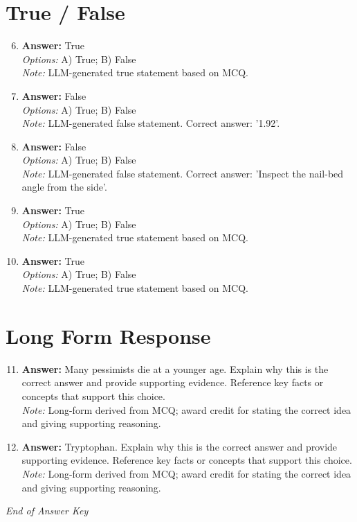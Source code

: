 \documentclass[12pt]{article}
\begin{document}
\section*{True / False}
\begin{enumerate}[label=\arabic*.]
\setcounter{enumi}{5}
\item \textbf{Answer:} True
\\ \textit{Options:} A) True; B) False
\\ \textit{Note:} LLM-generated true statement based on MCQ.
\item \textbf{Answer:} False
\\ \textit{Options:} A) True; B) False
\\ \textit{Note:} LLM-generated false statement. Correct answer: '1.92'.
\item \textbf{Answer:} False
\\ \textit{Options:} A) True; B) False
\\ \textit{Note:} LLM-generated false statement. Correct answer: 'Inspect the nail-bed angle from the side'.
\item \textbf{Answer:} True
\\ \textit{Options:} A) True; B) False
\\ \textit{Note:} LLM-generated true statement based on MCQ.
\item \textbf{Answer:} True
\\ \textit{Options:} A) True; B) False
\\ \textit{Note:} LLM-generated true statement based on MCQ.
\end{enumerate}

\section*{Long Form Response}
\begin{enumerate}[label=\arabic*.]
\setcounter{enumi}{10}
\item \textbf{Answer:} Many pessimists die at a younger age. Explain why this is the correct answer and provide supporting evidence. Reference key facts or concepts that support this choice.
\\ \textit{Note:} Long-form derived from MCQ; award credit for stating the correct idea and giving supporting reasoning.
\item \textbf{Answer:} Tryptophan. Explain why this is the correct answer and provide supporting evidence. Reference key facts or concepts that support this choice.
\\ \textit{Note:} Long-form derived from MCQ; award credit for stating the correct idea and giving supporting reasoning.
\end{enumerate}

\vfill
\noindent\textit{End of Answer Key}
\end{document}
